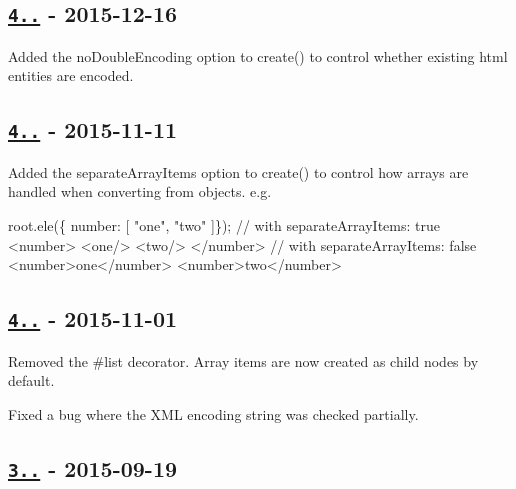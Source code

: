 \subsection*{\href{https://github.com/oozcitak/xmlbuilder-js/compare/v4.1.0...v4.2.0}{\tt 4..} -\/ 2015-\/12-\/16}


\begin{DoxyItemize}
\item Added the {\ttfamily no\+Double\+Encoding} option to {\ttfamily create()} to control whether existing html entities are encoded.
\end{DoxyItemize}

\subsection*{\href{https://github.com/oozcitak/xmlbuilder-js/compare/v4.0.0...v4.1.0}{\tt 4..} -\/ 2015-\/11-\/11}


\begin{DoxyItemize}
\item Added the {\ttfamily separate\+Array\+Items} option to {\ttfamily create()} to control how arrays are handled when converting from objects. e.\+g.
\end{DoxyItemize}


\begin{DoxyCode}
root.ele(\{ number: [ "one", "two"  ]\});
// with separateArrayItems: true
<number>
  <one/>
  <two/>
</number>
// with separateArrayItems: false
<number>one</number>
<number>two</number>
\end{DoxyCode}


\subsection*{\href{https://github.com/oozcitak/xmlbuilder-js/compare/v3.1.0...v4.0.0}{\tt 4..} -\/ 2015-\/11-\/01}


\begin{DoxyItemize}
\item Removed the {\ttfamily \#list} decorator. Array items are now created as child nodes by default.
\item Fixed a bug where the X\+ML encoding string was checked partially.
\end{DoxyItemize}

\subsection*{\href{https://github.com/oozcitak/xmlbuilder-js/compare/v3.0.0...v3.1.0}{\tt 3..} -\/ 2015-\/09-\/19}


